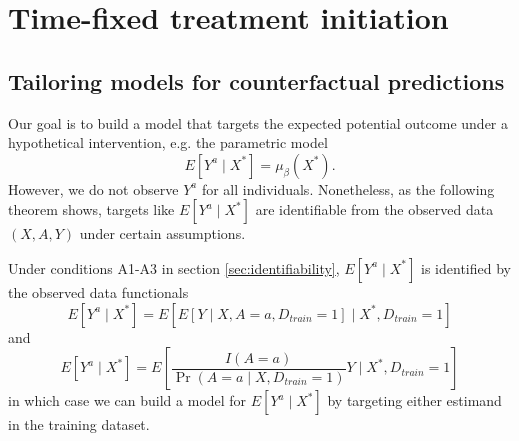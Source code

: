 
\section{Time-fixed treatment initiation} \label{sec:appendixa}

    \subsection{Tailoring models for counterfactual predictions}\label{sec:model_proof}
    Our goal is to build a model that targets the expected potential outcome under a hypothetical intervention, e.g. the parametric model 
    $$E[Y^a \mid X^*] = \mu_{\beta}(X^*).$$
    However, we do not observe $Y^a$ for all individuals. Nonetheless, as the following theorem shows, targets like $E[Y^a \mid X^*]$ are identifiable from the observed data $(X, A, Y)$ under certain assumptions. 
    
    \begin{theorem}
     Under conditions A1-A3 in section \ref{sec:identifiability}, $E[Y^a \mid X^*]$ is identified by the observed data functionals
    \begin{equation}
        E[Y^a \mid X^*] = E[E[Y \mid X, A = a, D_{train} = 1] \mid X^*, D_{train} = 1]
    \end{equation}
    and
    \begin{equation}
        E[Y^a \mid X^*] = E\left[\frac{I(A = a)}{\Pr(A = a \mid X, D_{train} = 1)} Y \mid X^*, D_{train} = 1\right]
    \end{equation}
    in which case we can build a model for $E[Y^a \mid X^*]$ by targeting either estimand in the training dataset.
    \end{theorem}
    

